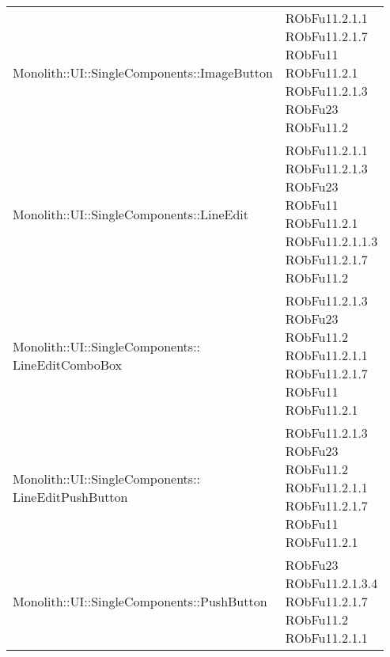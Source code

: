 \begin{center}
\begin{longtable}{|
*{1}{>{\centering\arraybackslash}m{7.5cm}|}
*{1}{>{\centering\arraybackslash}m{2.5cm}|}}
{\\RObFu11.2.1.3.3
\\RObFu23
\\RObFu11.2
\\}\\\hline
Monolith::UI::SingleComponents::ImageButton & \makecell{RObFu11.2.1.1
\\RObFu11.2.1.7
\\RObFu11
\\RObFu11.2.1
\\RObFu11.2.1.3
\\RObFu23
\\RObFu11.2
\\}\\\hline
Monolith::UI::SingleComponents::LineEdit & \makecell{RObFu11.2.1.1
\\RObFu11.2.1.3
\\RObFu23
\\RObFu11
\\RObFu11.2.1
\\RObFu11.2.1.1.3
\\RObFu11.2.1.7
\\RObFu11.2
\\}\\\hline
\makecell[l]{Monolith::UI::SingleComponents:: \\ \hfill LineEditComboBox} & \makecell{RObFu11.2.1.3
\\RObFu23
\\RObFu11.2
\\RObFu11.2.1.1
\\RObFu11.2.1.7
\\RObFu11
\\RObFu11.2.1
\\}\\\hline
\makecell[l]{Monolith::UI::SingleComponents:: \\ \hfill LineEditPushButton} & \makecell{RObFu11.2.1.3
\\RObFu23
\\RObFu11.2
\\RObFu11.2.1.1
\\RObFu11.2.1.7
\\RObFu11
\\RObFu11.2.1
\\}\\\hline
Monolith::UI::SingleComponents::PushButton & \makecell{RObFu23
\\RObFu11.2.1.3.4
\\RObFu11.2.1.7
\\RObFu11.2
\\RObFu11.2.1.1
}
\end{longtable}
\end{center}
